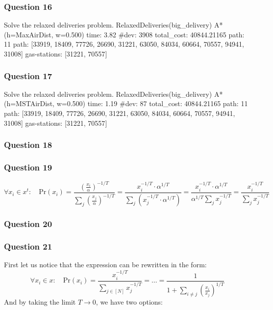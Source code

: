 \documentclass[11pt]{article}
\begin{document}
    \subsubsection{Question 16}\label{question-16}

Solve the relaxed deliveries problem. RelaxedDeliveries(big\_delivery)
A* (h=MaxAirDist, w=0.500) time: 3.82 \#dev: 3908 total\_cost:
40844.21165 \textbar{}path\textbar{}: 11 path: {[}33919, 18409, 77726,
26690, 31221, 63050, 84034, 60664, 70557, 94941, 31008{]} gas-stations:
{[}31221, 70557{]}

    \subsubsection{Question 17}\label{question-17}

Solve the relaxed deliveries problem. RelaxedDeliveries(big\_delivery)
A* (h=MSTAirDist, w=0.500) time: 1.19 \#dev: 87 total\_cost: 40844.21165
\textbar{}path\textbar{}: 11 path: {[}33919, 18409, 77726, 26690, 31221,
63050, 84034, 60664, 70557, 94941, 31008{]} gas-stations: {[}31221,
70557{]}

    \subsubsection{Question 18}\label{question-18}

    \subsubsection{Question 19}\label{question-19}

\[
\forall x_{i}\in x^{t}:\quad\text{Pr}\left(x_{i}\right)=\frac{\left(\frac{x_{i}}{\alpha}\right)^{-1/T}}{\sum_{j}\left(\frac{x_{j}}{\alpha}\right)^{-1/T}}=\frac{x_{i}^{-1/T}\cdot\alpha^{1/T}}{\sum_{j}\left(x_{j}^{-1/T}\cdot\alpha^{1/T}\right)}=\frac{x_{i}^{-1/T}\cdot\alpha^{1/T}}{\alpha^{1/T}\sum_{j}x_{j}^{-1/T}}=\frac{x_{i}^{-1/T}}{\sum_{j}x_{j}^{-1/T}}
\]

    \subsubsection{Question 20}\label{question-20}

    \subsubsection{Question 21}\label{question-21}

First let us notice that the expression can be rewritten in the form:
\[\forall x_{i}\in x:\quad\text{Pr}\left(x_{i}\right)=\frac{x_{i}^{-1/T}}{\sum_{j\in\left[N\right]}x_{j}^{-1/T}}=\dots=\frac{1}{1+\sum_{i\neq j}\left(\frac{x_{i}}{x_{j}}\right)^{1/T}}\]
And by taking the limit \(T\to0\), we have two options:
\end{document}
